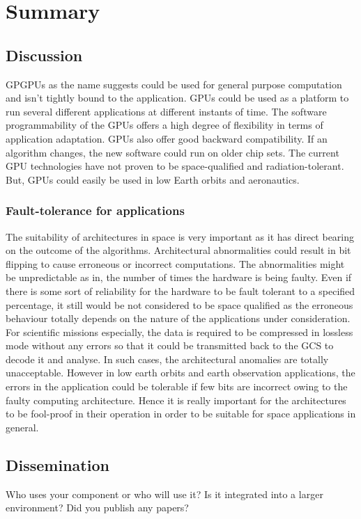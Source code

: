 \chapter{Summary\label{cha:chapter6}}
\section{Discussion}\label{sec:dis}
\glspl{GPGPU} as the name suggests could be used for general purpose computation and isn't tightly bound to the application. \glspl{GPU} could be used as a platform to run several different applications at different instants of time. The software programmability of the \glspl{GPU} offers a high degree of flexibility in terms of application adaptation. \glspl{GPU} also offer good backward compatibility. If an algorithm changes, the new software could run on older chip sets. The current \gls{GPU} technologies have not proven to be space-qualified and radiation-tolerant. But, \glspl{GPU} could easily be used in low Earth orbits and aeronautics.

\subsection{Fault-tolerance for applications}\label{sec:dis:fault}
The suitability of architectures in space is very important as it has direct bearing on the outcome of the algorithms. Architectural abnormalities could result in bit flipping to cause erroneous or incorrect computations. The abnormalities might be unpredictable as in, the number of times the hardware is being faulty. Even if there is some sort of reliability for the hardware to be fault tolerant to a specified percentage, it still would be not considered to be space qualified as the erroneous behaviour totally depends on the nature of the applications under consideration. For scientific missions especially, the data is required to be compressed in lossless mode without any errors so that it could be transmitted back to the \gls{GCS} to decode it and analyse. In such cases, the architectural anomalies are totally unacceptable. However in low earth orbits and earth observation applications, the errors in the application could be tolerable if few bits are incorrect owing to the faulty computing architecture. Hence it is really important for the architectures to be fool-proof in their operation in order to be suitable for space applications in general.

\section{Dissemination}\label{sec:diss}
Who uses your component or who will use it? Is it integrated into a larger environment? Did you publish any papers?

